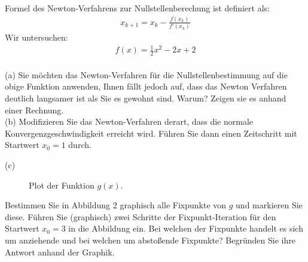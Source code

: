 \documentclass{scrartcl}
\begin{document}

Formel des Newton-Verfahrens zur Nullstellenberechung ist definiert als:
\begin{align*}
x_{k+1} = x_k - \frac{f(x_k)}{f'(x_k)}
\end{align*}
Wir untersuchen:
\begin{align*}
f(x) = \frac{1}{2}x^2 - 2x + 2
\end{align*}
\\
(a)
Sie möchten das Newton-Verfahren für die Nullstellenbestimmung auf die obige Funktion anwenden, Ihnen fällt jedoch auf, dass das Newton Verfahren deutlich langsamer ist als Sie es gewohnt sind. Warum? Zeigen sie es anhand einer Rechnung.
\lbreak \lbreak \lbreak \lbreak
\\
(b)
Modifizieren Sie das Newton-Verfahren derart, dass die normale Konvergenzgeschwindigkeit erreicht wird.
\n 
Führen Sie dann einen Zeitschritt mit Startwert $x_0=1$ durch.

\newpage
(c)
\begin{figure}[ht]
	\centering
	\caption{Plot der Funktion $g(x)$.}
\end{figure}
Bestimmen Sie in Abbildung 2 graphisch alle Fixpunkte von $g$ und markieren Sie diese.
\n 
Führen Sie (graphisch) zwei Schritte der Fixpunkt-Iteration für den Startwert $x_0=3$ in die Abbildung ein.
\n 
Bei welchen der Fixpunkte handelt es sich um anziehende und bei welchen um abstoßende Fixpunkte? Begründen Sie ihre Antwort anhand der Graphik.
	
\end{document}
